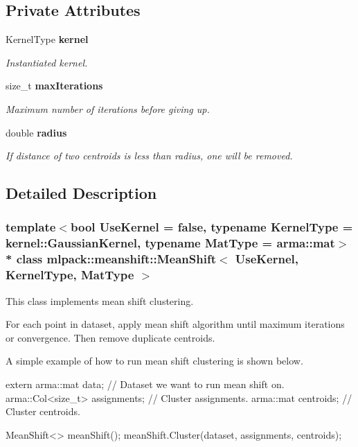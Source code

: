 \subsection*{Private Attributes}
\begin{DoxyCompactItemize}
\item 
Kernel\+Type {\bf kernel}
\begin{DoxyCompactList}\small\item\em Instantiated kernel. \end{DoxyCompactList}\item 
size\+\_\+t {\bf max\+Iterations}
\begin{DoxyCompactList}\small\item\em Maximum number of iterations before giving up. \end{DoxyCompactList}\item 
double {\bf radius}
\begin{DoxyCompactList}\small\item\em If distance of two centroids is less than radius, one will be removed. \end{DoxyCompactList}\end{DoxyCompactItemize}


\subsection{Detailed Description}
\subsubsection*{template$<$bool Use\+Kernel = false, typename Kernel\+Type = kernel\+::\+Gaussian\+Kernel, typename Mat\+Type = arma\+::mat$>$\\*
class mlpack\+::meanshift\+::\+Mean\+Shift$<$ Use\+Kernel, Kernel\+Type, Mat\+Type $>$}

This class implements mean shift clustering. 

For each point in dataset, apply mean shift algorithm until maximum iterations or convergence. Then remove duplicate centroids.

A simple example of how to run mean shift clustering is shown below.


\begin{DoxyCode}
\textcolor{keyword}{extern} arma::mat data; \textcolor{comment}{// Dataset we want to run mean shift on.}
arma::Col<size\_t> assignments; \textcolor{comment}{// Cluster assignments.}
arma::mat centroids; \textcolor{comment}{// Cluster centroids.}

MeanShift<> meanShift();
meanShift.Cluster(dataset, assignments, centroids);
\end{DoxyCode}



